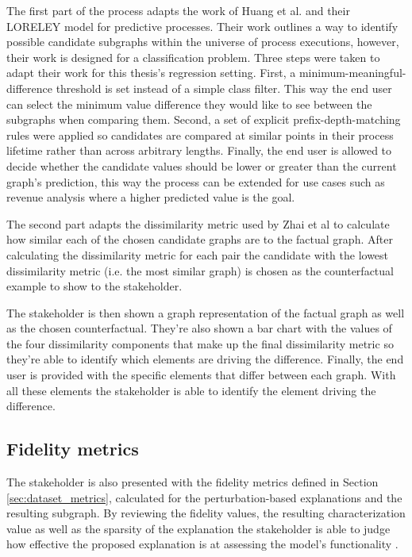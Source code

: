         The first part of the process adapts the work of Huang et al. \cite{huang2022} and their LORELEY model for predictive processes. Their work outlines a way to identify possible candidate subgraphs within the universe of process executions, however, their work is designed for a classification problem. Three steps were taken to adapt their work for this thesis's regression setting. First, a minimum-meaningful-difference threshold is set instead of a simple class filter. This way the end user can select the minimum value difference they would like to see between the subgraphs when comparing them. Second, a set of explicit prefix-depth-matching rules were applied so candidates are compared at similar points in their process lifetime rather than across arbitrary lengths. Finally, the end user is allowed to decide whether the candidate values should be lower or greater than the current graph's prediction, this way the process can be extended for use cases such as revenue analysis where a higher predicted value is the goal.

        The second part adapts the dissimilarity metric used by Zhai et al \cite{zhai2025} to calculate how similar each of the chosen candidate graphs are to the factual graph. After calculating the dissimilarity metric for each pair the candidate with the lowest dissimilarity metric (i.e. the most similar graph) is chosen as the counterfactual example to show to the stakeholder.

        The stakeholder is then shown a graph representation of the factual graph as well as the chosen counterfactual. They're also shown a bar chart with the values of the four dissimilarity components that make up the final dissimilarity metric so they're able to identify which elements are driving the difference. Finally, the end user is provided with the specific elements that differ between each graph. With all these elements the stakeholder is able to identify the element driving the difference.

    \subsection{Fidelity metrics}
        The stakeholder is also presented with the fidelity metrics defined in Section \ref{sec:dataset_metrics}, calculated for the perturbation-based explanations and the resulting subgraph. By reviewing the fidelity values, the resulting characterization value as well as the sparsity of the explanation the stakeholder is able to judge how effective the proposed explanation is at assessing the model's functionality \cite{stevens2022}. 
